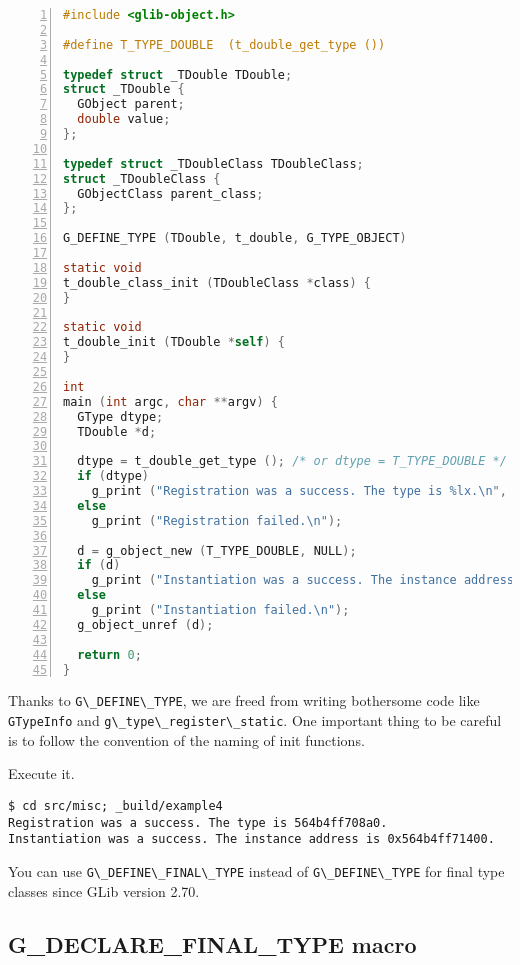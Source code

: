 \begin{lstlisting}[language=C, numbers=left]
#include <glib-object.h>

#define T_TYPE_DOUBLE  (t_double_get_type ())

typedef struct _TDouble TDouble;
struct _TDouble {
  GObject parent;
  double value;
};

typedef struct _TDoubleClass TDoubleClass;
struct _TDoubleClass {
  GObjectClass parent_class;
};

G_DEFINE_TYPE (TDouble, t_double, G_TYPE_OBJECT)

static void
t_double_class_init (TDoubleClass *class) {
}

static void
t_double_init (TDouble *self) {
}

int
main (int argc, char **argv) {
  GType dtype;
  TDouble *d;

  dtype = t_double_get_type (); /* or dtype = T_TYPE_DOUBLE */
  if (dtype)
    g_print ("Registration was a success. The type is %lx.\n", dtype);
  else
    g_print ("Registration failed.\n");

  d = g_object_new (T_TYPE_DOUBLE, NULL);
  if (d)
    g_print ("Instantiation was a success. The instance address is %p.\n", d);
  else
    g_print ("Instantiation failed.\n");
  g_object_unref (d);

  return 0;
}
\end{lstlisting}

Thanks to \passthrough{\lstinline!G\_DEFINE\_TYPE!}, we are freed from
writing bothersome code like \passthrough{\lstinline!GTypeInfo!} and
\passthrough{\lstinline!g\_type\_register\_static!}. One important thing
to be careful is to follow the convention of the naming of init
functions.

Execute it.

\begin{lstlisting}
$ cd src/misc; _build/example4
Registration was a success. The type is 564b4ff708a0.
Instantiation was a success. The instance address is 0x564b4ff71400.
\end{lstlisting}

You can use \passthrough{\lstinline!G\_DEFINE\_FINAL\_TYPE!} instead of
\passthrough{\lstinline!G\_DEFINE\_TYPE!} for final type classes since
GLib version 2.70.

\subsection{G\_DECLARE\_FINAL\_TYPE
macro}\label{g_declare_final_type-macro}

